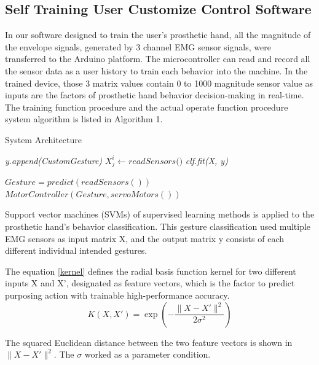 \documentclass[conference]{IEEEtran}
\begin{document}
\subsection{Self Training User Customize Control Software}

In our software designed to train the user's prosthetic hand, all the magnitude of the envelope signals, generated by 3 channel EMG sensor signals, were transferred to the Arduino platform. The microcontroller can read and record all the sensor data as a user history to train each behavior into the machine. In the trained device, those 3 matrix values contain 0 to 1000 magnitude sensor value as inputs are the factors of prosthetic hand behavior decision-making in real-time.
The training function procedure and the actual operate function procedure system algorithm is listed in Algorithm 1.

\begin{algorithm}
\caption{System Architecture}
\label{alg:sysArch}
\begin{algorithmic}[1]

\State \textit{y.append(CustomGesture)}
        \State $ \textit{$X_{j}^i$} \gets \textit{readSensors()}$
        \EndFor
    \EndFor
\State \textit{clf.fit(X, y)}
\EndProcedure

\State \textit{ $Gesture = predict(readSensors()) $}
\State \textit{ $MotorController(Gesture, servoMotors())$ }
\EndWhile\label{endwhile}
\EndProcedure
\end{algorithmic}
\end{algorithm}

Support vector machines (SVMs) \cite{ML1}\cite{ML2} of supervised learning methods is applied to the prosthetic hand's behavior classification. This gesture classification used multiple EMG sensors as input matrix X, and the output matrix y consists of each different individual intended gestures.  

The equation \eqref{kernel} defines the radial basis function kernel for two different inputs X and X', designated as feature vectors, which is the factor to predict purposing action with trainable high-performance accuracy.
\begin{equation}
K(X,X') = \exp(-\frac{\lVert X - X' \rVert^2}{2\sigma^2})
\label{kernel}
\end{equation}

The squared Euclidean distance between the two feature vectors is shown in $\lVert X - X' \rVert^2$.
The $\sigma$ worked as a parameter condition.
\end{document}
